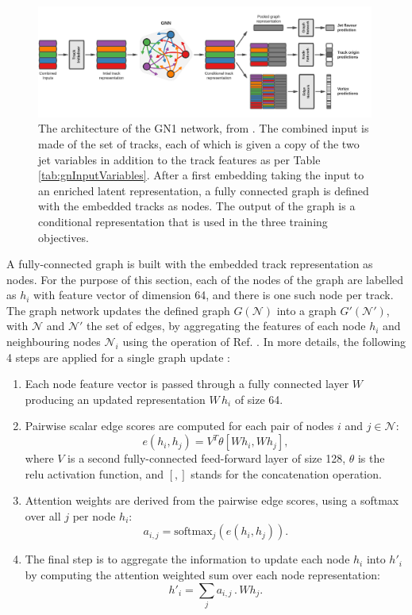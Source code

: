 \begin{figure}[h!]
  \center
  \includegraphics[width=0.99\textwidth]{Images/FTAG/GN/Intro/gnn_architecture.png}
  \caption{The architecture of the GN1 network, from \cite{ATL-PHYS-PUB-2022-027}. The combined input is made of the set of tracks, each of which is given a copy of the two jet variables in addition to the track features as per Table \ref{tab:gnInputVariables}. After a first embedding taking the input to an enriched latent representation, a fully connected graph is defined with the embedded tracks as nodes. The output of the graph is a conditional representation that is used in the three training objectives.} 
  \label{fig:gnnArchitecture}
\end{figure}

A fully-connected graph is built with the embedded track representation as nodes. For the purpose of this section, each of the nodes of the graph are labelled as $h_i$ with feature vector of dimension 64, and there is one such node per track. The graph network updates the defined graph $G(\mathcal{N})$ into a graph $G'(\mathcal{N}')$, with $\mathcal{N}$ and $\mathcal{N}'$ the set of edges, by aggregating the features of each node $h_i$ and neighbouring nodes $\mathcal{N}_i$ using the operation of Ref. \cite{brody2022how}. In more details, the following 4 steps are applied for a single graph update \cite{ATL-PHYS-PUB-2022-027}:
\begin{enumerate}
  \item Each node feature vector is passed through a fully connected layer $W$ producing an updated representation $W\,h_i$ of size 64.
  \item Pairwise scalar edge scores are computed for each pair of nodes $i$ and $j \in \mathcal{N}$: 
  \begin{equation}
    e\left(h_i, h_j\right) = V^T \theta [Wh_i, Wh_j],
  \end{equation}
  where $V$ is a second fully-connected feed-forward layer of size 128, $\theta$ is the \gls{relu} activation function, and $[,]$ stands for the concatenation operation. 
  \item Attention weights are derived from the pairwise edge scores, using a softmax over all $j$ per node $h_i$:
  \begin{equation}
    a_{i,j} = \textrm{softmax}_j\left(e(h_i, h_j)\right).
  \end{equation}
  \item The final step is to aggregate the information to update each node $h_i$ into $h'_i$ by computing the attention weighted sum over each node representation: 
  \begin{equation}
    h'_i = \sum_j a_{i,j} \,.\, W h_j.
  \end{equation} 
\end{enumerate}

